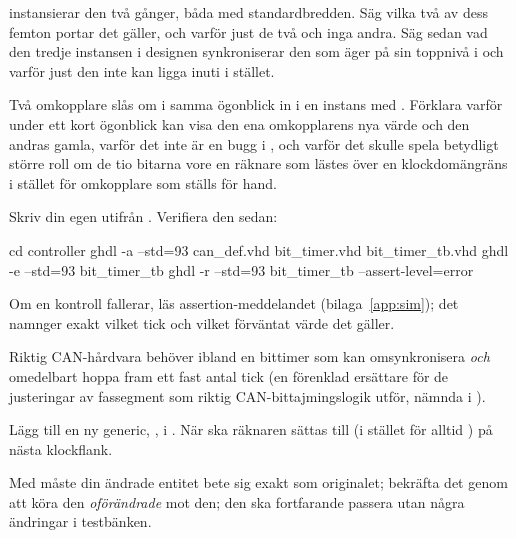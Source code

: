   instansierar den två gånger, båda med standardbredden. Säg vilka två
av dess femton portar det gäller, och varför just de två och inga andra. Säg sedan vad den tredje
instansen i designen synkroniserar \textemdash{} den som  äger på sin toppnivå i
 \textemdash{} och varför just den inte kan ligga inuti  i
stället.

 Två omkopplare slås om i samma ögonblick in i en instans med . Förklara
varför  under ett kort ögonblick kan visa den ena omkopplarens nya värde och den
andras gamla, varför det inte är en bugg i , och varför det skulle spela betydligt
större roll om de tio bitarna vore en räknare som lästes över en klockdomängräns i stället för
omkopplare som ställs för hand.


\label{c12:ex:bittimer}
Skriv din egen  utifrån . Verifiera den sedan:

\begin{shell}
cd controller
ghdl -a --std=93 can_def.vhd bit_timer.vhd bit_timer_tb.vhd
ghdl -e --std=93 bit_timer_tb
ghdl -r --std=93 bit_timer_tb --assert-level=error
\end{shell}

Om en kontroll fallerar, läs assertion-meddelandet (bilaga~\ref{app:sim}); det namnger exakt vilket
tick och vilket förväntat värde det gäller.

\label{c12:ex:offset}
Riktig CAN-hårdvara behöver ibland en bittimer som kan omsynkronisera \emph{och} omedelbart hoppa
fram ett fast antal tick (en förenklad ersättare för de justeringar av fassegment som riktig
CAN-bittajmingslogik utför, nämnda i ).

 Lägg till en ny generic, , i . När
 ska räknaren sättas till  (i stället för alltid ) på
nästa klockflank.

 Med  måste din ändrade entitet bete sig exakt som originalet;
bekräfta det genom att köra den \emph{oförändrade}  mot den; den ska
fortfarande passera utan några ändringar i testbänken.

